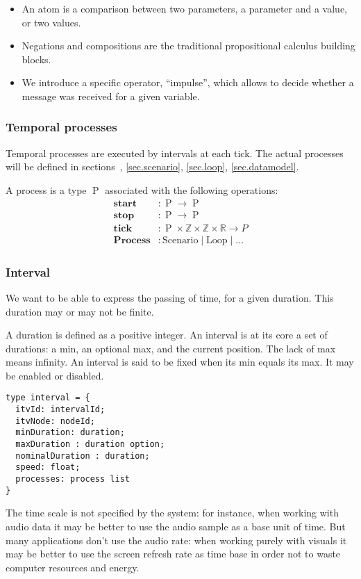 \documentclass[applsci,article,submit,moreauthors,pdftex,10pt,a4paper]{mdpi}
\DeclareMathOperator{\proc}{P}
\begin{document}
\begin{itemize}
    \item An atom is a comparison between two parameters, a parameter and a value, or two values.
    \item Negations and compositions are the traditional propositional calculus building blocks.
    \item We introduce a specific operator, ``impulse'', which allows to decide whether a message was received for a given variable.
\end{itemize}

\subsubsection{Temporal processes}
Temporal processes are executed by intervals at each tick. 
The actual processes will be defined in sections~, \ref{sec.scenario}, \ref{sec.loop}, \ref{sec.datamodel}.

A process is a type $\proc$ associated with the following operations: 
\begin{align*}\label{proc.funs}
\mathbf{start}&: \proc \rightarrow \proc \\
\mathbf{stop}&: \proc \rightarrow \proc \\
\mathbf{tick}&: \proc \times \mathbb{Z} \times \mathbb{Z} \times \mathbb{R} \rightarrow P\\
\mathbf{Process}&: \mathrm{Scenario} \mid \mathrm{Loop} \mid  \dots
\end{align*}
\subsubsection{Interval}
We want to be able to express the passing of time, for a given duration.
This duration may or may not be finite.

A duration is defined as a positive integer.
An interval is at its core a set of durations: a min, an optional max, and the current position. 
The lack of max means infinity.
An interval is said to be fixed when its min equals its max. It may be enabled or disabled.

\begin{lstlisting}
type interval = {
  itvId: intervalId;
  itvNode: nodeId;
  minDuration: duration;
  maxDuration : duration option;
  nominalDuration : duration;
  speed: float;
  processes: process list
}
\end{lstlisting}

The time scale is not specified by the system: for instance, when working with audio data it may be better to use the audio sample as a base unit of time.
But many applications don't use the audio rate: when working purely with visuals it may be better to use the screen refresh rate as time base in order not to 
waste computer resources and energy. 
\end{document}

